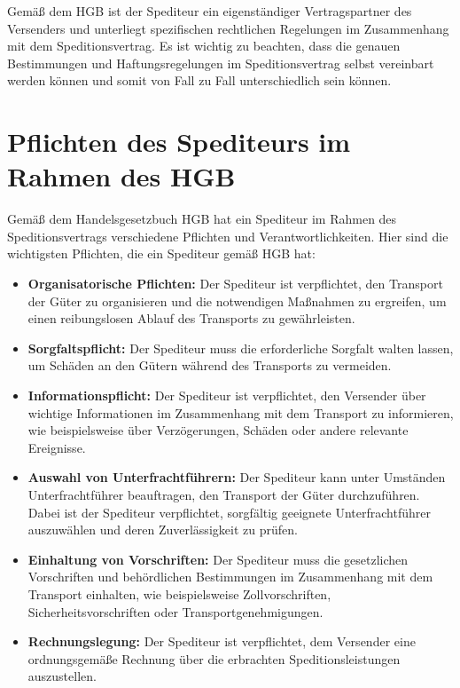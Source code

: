     Gemäß dem \ac{HGB} ist der Spediteur ein eigenständiger Vertragspartner des Versenders und unterliegt spezifischen rechtlichen Regelungen im Zusammenhang mit dem Speditionsvertrag.
    Es ist wichtig zu beachten, dass die genauen Bestimmungen und Haftungsregelungen im Speditionsvertrag selbst vereinbart werden können und somit von Fall zu Fall unterschiedlich sein können.
    
    \section{Pflichten des Spediteurs im Rahmen des \ac{HGB}}

Gemäß dem Handelsgesetzbuch \ac{HGB} hat ein Spediteur im Rahmen des Speditionsvertrags verschiedene Pflichten und Verantwortlichkeiten. Hier sind die wichtigsten Pflichten, die ein Spediteur gemäß \ac{HGB} hat:

\begin{itemize}
    \item \textbf{Organisatorische Pflichten:} Der Spediteur ist verpflichtet, den Transport der Güter zu organisieren und die notwendigen Maßnahmen zu ergreifen, um einen reibungslosen Ablauf des Transports zu gewährleisten.
    \item \textbf{Sorgfaltspflicht:} Der Spediteur muss die erforderliche Sorgfalt walten lassen, um Schäden an den Gütern während des Transports zu vermeiden.
    \item \textbf{Informationspflicht:} Der Spediteur ist verpflichtet, den Versender über wichtige Informationen im Zusammenhang mit dem Transport zu informieren, wie beispielsweise über Verzögerungen, Schäden oder andere relevante Ereignisse.
    \item \textbf{Auswahl von Unterfrachtführern:} Der Spediteur kann unter Umständen Unterfrachtführer beauftragen, den Transport der Güter durchzuführen. Dabei ist der Spediteur verpflichtet, sorgfältig geeignete Unterfrachtführer auszuwählen und deren Zuverlässigkeit zu prüfen.
    \item \textbf{Einhaltung von Vorschriften:} Der Spediteur muss die gesetzlichen Vorschriften und behördlichen Bestimmungen im Zusammenhang mit dem Transport einhalten, wie beispielsweise Zollvorschriften, Sicherheitsvorschriften oder Transportgenehmigungen.
    \item \textbf{Rechnungslegung:} Der Spediteur ist verpflichtet, dem Versender eine ordnungsgemäße Rechnung über die erbrachten Speditionsleistungen auszustellen.
    \end{itemize}

